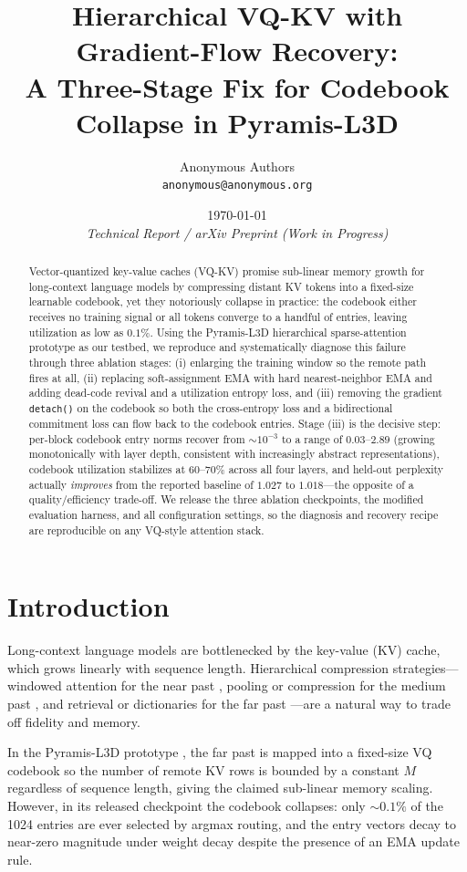 \documentclass[11pt,a4paper]{article}
\title{Hierarchical VQ-KV with Gradient-Flow Recovery:\\A Three-Stage Fix for Codebook Collapse in Pyramis-L3D}
\author{
  Anonymous Authors \\
  \texttt{anonymous@anonymous.org}
}
\date{\today \\ \textit{Technical Report / arXiv Preprint (Work in Progress)}}
\begin{document}
\maketitle

\begin{abstract}
Vector-quantized key-value caches (VQ-KV) promise sub-linear memory growth for long-context
language models by compressing distant KV tokens into a fixed-size learnable codebook, yet
they notoriously collapse in practice: the codebook either receives no training signal or all
tokens converge to a handful of entries, leaving utilization as low as $0.1\%$. Using the
Pyramis-L3D hierarchical sparse-attention prototype as our testbed, we reproduce and
systematically diagnose this failure through three ablation stages: (i) enlarging the
training window so the remote path fires at all, (ii) replacing soft-assignment EMA with hard
nearest-neighbor EMA and adding dead-code revival and a utilization entropy loss, and (iii)
removing the gradient \texttt{detach()} on the codebook so both the cross-entropy loss and a
bidirectional commitment loss can flow back to the codebook entries. Stage (iii) is the
decisive step: per-block codebook entry norms recover from $\sim 10^{-3}$ to a range of
$0.03$--$2.89$ (growing monotonically with layer depth, consistent with increasingly
abstract representations), codebook utilization stabilizes at $60$--$70\%$ across all four
layers, and held-out perplexity actually \textit{improves} from the reported baseline of
$1.027$ to $1.018$---the opposite of a quality/efficiency trade-off. We release the three
ablation checkpoints, the modified evaluation harness, and all configuration settings, so
the diagnosis and recovery recipe are reproducible on any VQ-style attention stack.
\end{abstract}

\section{Introduction}
Long-context language models are bottlenecked by the key-value (KV) cache, which grows
linearly with sequence length. Hierarchical compression strategies---windowed attention for
the near past \citep{beltagy2020longformer}, pooling or compression for the medium past
\citep{rae2020compressive}, and retrieval or dictionaries for the far past
\citep{wu2022memorizing}---are a natural way to trade off fidelity and memory.

In the Pyramis-L3D prototype \citep{pyramisl3d2026}, the far past is mapped into a
fixed-size VQ codebook so the number of remote KV rows is bounded by a constant $M$
regardless of sequence length, giving the claimed sub-linear memory scaling. However, in
its released checkpoint the codebook collapses: only $\sim 0.1\%$ of the 1024 entries are
ever selected by argmax routing, and the entry vectors decay to near-zero magnitude under
weight decay despite the presence of an EMA update rule.
\end{document}
